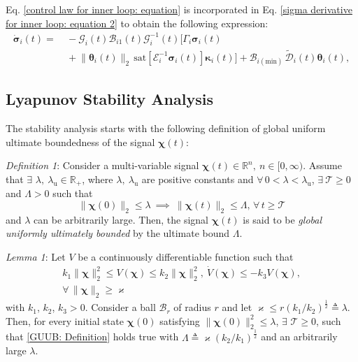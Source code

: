 \documentclass[lettersize,journal]{IEEEtran}
\begin{document}
Eq. \eqref{control law for inner loop: equation} is incorporated in Eq. \eqref{sigma derivative for inner loop: equation 2} to obtain the following expression:
\begin{align}
    \label{sigma derivative for inner loop: equation 3}
    \dot{\boldsymbol{\sigma}}_i(t) =&~ - \mathcal{G}_i(t) \mathcal{B}_{i1}(t) \mathcal{G}_i^{-1}(t) \big[\Gamma_i \boldsymbol{\sigma}_i(t) \nonumber \\ 
    & ~ + \lVert \boldsymbol{\theta}_i(t) \rVert_2 \, \text{sat}[ \mathcal{E}_i^{-1}\boldsymbol{\sigma}_i(t)] \boldsymbol{\kappa}_i(t)\big] + \mathcal{B}_{i (\text{min})} \, \tilde{\mathcal{D}}_i(t) \boldsymbol{\theta}_i(t),
\end{align}

\subsection{Lyapunov Stability Analysis}
The stability analysis starts with the following definition of global uniform ultimate boundedness of the signal $\boldsymbol{\chi}(t)$:

\textit{Definition 1}:
 Consider a multi-variable signal $\boldsymbol{\chi}(t) \in \mathbb{R}^n, ~n \in [0, \infty)$. Assume that $\exists$ $\lambda, ~ \lambda_{\text{u}} \in \mathbb{R}_+$, where $\lambda, ~ \lambda_{\text{u}}$ are positive constants and $\forall \, 0 < \lambda < \lambda_{\text{u}}$, $\exists ~ \mathcal{T} \geq 0$ and $\Lambda > 0$ such that
\begin{equation} \label{GUUB: Definition}
    \lVert \boldsymbol{\chi}(0) \rVert_2 \leq \lambda ~\implies~ \lVert \boldsymbol{\chi}(t) \rVert_2 \leq \Lambda,  \, \forall \, t \geq \mathcal{T}
\end{equation}
\noindent and $\lambda$ can be arbitrarily large. Then, the signal $\boldsymbol{\chi}(t)$ is said to be \textit{global uniformly ultimately bounded} by the ultimate bound $\Lambda$.

\textit{Lemma 1}:
Let $V$ be a continuously differentiable function such that 
\begin{align}
    k_1 \lVert \boldsymbol{\chi} \rVert^2_2 \leq V(\boldsymbol{\chi}) \leq k_2 \lVert \boldsymbol{\chi} \rVert^2_2, ~ \dot{V}(\boldsymbol{\chi}) \leq - k_3 V(\boldsymbol{\chi}),\\ \forall \, \lVert \boldsymbol{\chi} \rVert_2 \geq \varkappa \nonumber
\end{align}
\noindent with $k_1$, $k_2$, $k_3 > 0$. Consider a ball $\mathcal{B}_r$ of radius $r$ and let $\varkappa \leq r (k_1/k_2)^{\frac{1}{2}} \triangleq \lambda$.
\noindent Then, for every initial state $\boldsymbol{\chi}(0)$ satisfying $\lVert \boldsymbol{\chi}(0) \rVert^2_2 \leq \lambda$, $\exists$ $\mathcal{T} \geq 0$, such that \eqref{GUUB: Definition} holds true with $\Lambda \triangleq \varkappa (k_2/k_1)^{\frac{1}{2}}$ and an arbitrarily large $\lambda$. 
\end{document}
